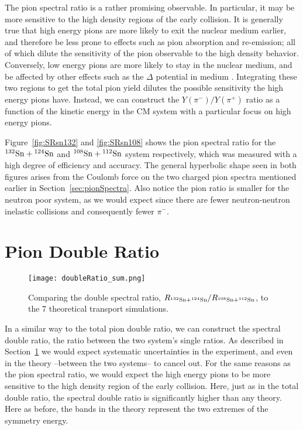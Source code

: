 The pion spectral ratio is a rather promising observable. In particular, it may be more sensitive to the high density regions of the early collision. It is generally true that high energy pions are more likely to exit the nuclear medium  earlier, and therefore be less prone to effects such as pion absorption and re-emission; all of which dilute the sensitivity of the pion observable to the high density behavior. Conversely, low energy pions are more likely to stay in the nuclear medium, and be affected by other effects such as the $\Delta$ potential in medium \cite{baoan_deltapotential}. Integrating these two regions to get the total pion yield dilutes the possible sensitivity the high energy pions have. Instead, we can construct the $Y(\pi^-)/Y(\pi^+)$ ratio as a function of the kinetic energy in the CM system with a particular focus on high energy pions.


Figure~\ref{fig:SRsn132} and \ref{fig:SRsn108} shows the pion spectral ratio for the ${}^{132}\mathrm{Sn} + {}^{124}\mathrm{Sn}$ and ${}^{108}\mathrm{Sn} + {}^{112}\mathrm{Sn}$ system respectively, which was measured with a high degree of efficiency and accuracy. The general hyperbolic shape seen in both figures arises from the Coulomb force on the two charged pion spectra mentioned earlier in Section~\ref{sec:pionSpectra}. Also notice the pion ratio is smaller for the neutron poor system, as we would expect since there are fewer neutron-neutron inelastic collisions and consequently fewer $\pi^-$. 




\section{Pion Double Ratio}
\label{sec:doubleRatio}

\begin{figure}[!htb]
\centering
\texttt{[image: doubleRatio\_sum.png]}
\caption{Comparing the double spectral ratio, $R_{{}^{132}\mathrm{Sn} + {}^{124}\mathrm{Sn}}/R_{{}^{108}\mathrm{Sn} + {}^{112}\mathrm{Sn}}$, to the 7 theoretical transport simulations.}
\label{fig:spectraDR}
\end{figure}

In a similar way to the total pion double ratio, we can construct the spectral double ratio, the ratio between the two system's single ratios. As described in Section~\ref{sec:doubleRatio} we would expect systematic uncertainties in the experiment, and even in the theory --between the two systems-- to cancel out. For the same reasons as the pion spectral ratio, we would expect the high energy pions to be more sensitive to the high density region of the early collision. Here, just as in the total double ratio, the spectral double ratio is significantly higher than any theory. Here as before, the bands in the theory represent the two extremes of the symmetry energy. 
